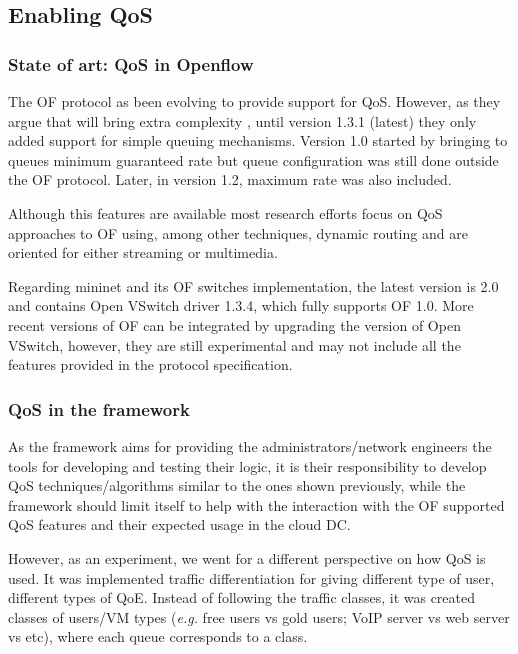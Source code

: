\documentclass[12pt,english,oneside]{book}
\begin{document}
\subsection{Enabling QoS}
\subsubsection{State of art: QoS in Openflow}
\hspace{0.6cm}

The OF protocol as been evolving to provide support for QoS.
However, as they argue that will bring extra complexity \cite{qosof}, until version 1.3.1 (latest) they only added support for simple queuing mechanisms.
Version 1.0 started by bringing to queues minimum guaranteed rate but queue configuration was still done outside the OF protocol. Later, in version 1.2, maximum rate was also included.

Although this features are available most research efforts focus on QoS approaches to OF using, among other techniques, dynamic routing and are oriented for either streaming\cite{ofqos2}\cite{ofqos3} or multimedia\cite{ofqos1}.

Regarding mininet and its OF switches implementation, the latest version is 2.0 and contains Open VSwitch driver 1.3.4, which fully supports OF 1.0.
More recent versions of OF can be integrated by upgrading the version of Open VSwitch, however, they are still experimental and may not include all the features provided in the protocol specification.

\subsubsection{QoS in the framework}
\hspace{0.6cm}

As the framework aims for providing the administrators/network engineers the tools for developing and testing their logic, it is their responsibility to develop QoS techniques/algorithms similar to the ones shown previously, while the framework should limit itself to help with the interaction with the OF supported QoS features and their expected usage in the cloud DC.

However, as an experiment, we went for a different perspective on how QoS is used.
It was implemented traffic differentiation for giving different type of user, different types of QoE.
Instead of following the traffic classes, it was created classes of users/VM types (\textit{e.g.} free users vs gold users; VoIP server vs web server vs etc), where each queue corresponds to a class.
\end{document}
